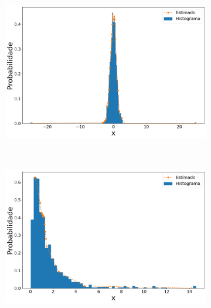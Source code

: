 \begin{figure}[H]
\begin{subfigure}[b]{0.45\textwidth}
		\caption{}
		\label{fig:ipdf2_norm15_data_out}
	\end{subfigure}
	\hfill
	\begin{subfigure}[b]{0.45\textwidth}
		\centering 
		\includegraphics[width=\linewidth]{./figuras/iPDF2_normal_25_1_1000_25}
		\caption{}
		\label{fig:ipdf2_norm25_data_out}
	\end{subfigure}
	\\
	\begin{subfigure}[b]{0.45\textwidth}
		\centering 
		\includegraphics[width=\linewidth]{./figuras/iPDF2_lognormal_15_1_1000_0}
		\caption{}
		\label{fig:ipdf2_lognorm15_data}
	\end{subfigure}
	\hfill
	\begin{subfigure}[b]{0.45\textwidth}
		\centering 

\end{subfigure}
\end{figure}
